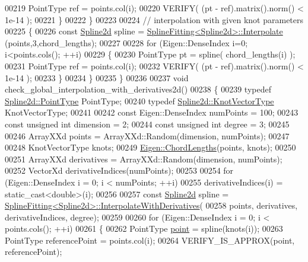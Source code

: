 \begin{DoxyCode}
00219       PointType ref = points.col(i);
00220       VERIFY( (pt - ref).matrix().norm() < 1e-14 );
00221     \}
00222   \}
00223 
00224   \textcolor{comment}{// interpolation with given knot parameters}
00225   \{
00226     \textcolor{keyword}{const} \hyperlink{namespace_eigen_aad3d357fe2fef560e7d8e592fb215fbf}{Spline2d} spline = \hyperlink{group___splines___module_adc80b6f0dd0dbbea28130fb254626874}{SplineFitting<Spline2d>::Interpolate}
      (points,3,chord\_lengths);  
00227 
00228     \textcolor{keywordflow}{for} (Eigen::DenseIndex i=0; i<points.cols(); ++i)
00229     \{
00230       PointType pt = spline( chord\_lengths(i) );
00231       PointType ref = points.col(i);
00232       VERIFY( (pt - ref).matrix().norm() < 1e-14 );
00233     \}
00234   \}
00235 \}
00236 
00237 \textcolor{keywordtype}{void} check\_global\_interpolation\_with\_derivatives2d()
00238 \{
00239   \textcolor{keyword}{typedef} \hyperlink{group___splines___module_a9ade8a2f81dae6eedb8845cb080672bd}{Spline2d::PointType} PointType;
00240   \textcolor{keyword}{typedef} \hyperlink{group___splines___module_a066f7a8b120316c9068b559f0790e9ec}{Spline2d::KnotVectorType} KnotVectorType;
00241 
00242   \textcolor{keyword}{const} Eigen::DenseIndex numPoints = 100;
00243   \textcolor{keyword}{const} \textcolor{keywordtype}{unsigned} \textcolor{keywordtype}{int} dimension = 2;
00244   \textcolor{keyword}{const} \textcolor{keywordtype}{unsigned} \textcolor{keywordtype}{int} degree = 3;
00245 
00246   ArrayXXd points = ArrayXXd::Random(dimension, numPoints);
00247 
00248   KnotVectorType knots;
00249   \hyperlink{group___splines___module_ga1b4cbde5d98411405871accf877552d2}{Eigen::ChordLengths}(points, knots);
00250 
00251   ArrayXXd derivatives = ArrayXXd::Random(dimension, numPoints);
00252   VectorXd derivativeIndices(numPoints);
00253 
00254   \textcolor{keywordflow}{for} (Eigen::DenseIndex i = 0; i < numPoints; ++i)
00255       derivativeIndices(i) = \textcolor{keyword}{static\_cast<}\textcolor{keywordtype}{double}\textcolor{keyword}{>}(i);
00256 
00257   \textcolor{keyword}{const} \hyperlink{namespace_eigen_aad3d357fe2fef560e7d8e592fb215fbf}{Spline2d} spline = 
      \hyperlink{group___splines___module_a7bd937fdcfa168dbdc27932886a4da9f}{SplineFitting<Spline2d>::InterpolateWithDerivatives}(
00258     points, derivatives, derivativeIndices, degree);  
00259     
00260   \textcolor{keywordflow}{for} (Eigen::DenseIndex i = 0; i < points.cols(); ++i)
00261   \{
00262     PointType \hyperlink{structpoint}{point} = spline(knots(i));
00263     PointType referencePoint = points.col(i);
00264     VERIFY\_IS\_APPROX(point, referencePoint);

\end{DoxyCode}
